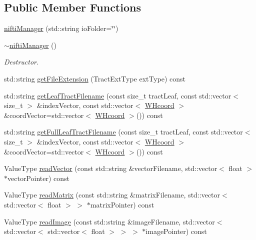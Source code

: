 \subsection*{\-Public \-Member \-Functions}
\begin{DoxyCompactItemize}
\item 
\hyperlink{classniftiManager_a61073824d9db9f8263f68af34854c6a2}{nifti\-Manager} (std\-::string io\-Folder=\char`\"{}\char`\"{})
\item 
\hypertarget{classniftiManager_a30a0d32f3c099739c521003623dc4003}{\hyperlink{classniftiManager_a30a0d32f3c099739c521003623dc4003}{$\sim$nifti\-Manager} ()}\label{classniftiManager_a30a0d32f3c099739c521003623dc4003}

\begin{DoxyCompactList}\small\item\em \-Destructor. \end{DoxyCompactList}\item 
std\-::string \hyperlink{classniftiManager_adedd75842b52a100303f7a953290d080}{get\-File\-Extension} (\-Tract\-Ext\-Type ext\-Type) const 
\item 
std\-::string \hyperlink{classniftiManager_ac3bb3fa42b34aefa6f6c70ba5e1c834b}{get\-Leaf\-Tract\-Filename} (const size\-\_\-t tract\-Leaf, const std\-::vector$<$ size\-\_\-t $>$ \&index\-Vector, const std\-::vector$<$ \hyperlink{classWHcoord}{\-W\-Hcoord} $>$ \&coord\-Vector=std\-::vector$<$ \hyperlink{classWHcoord}{\-W\-Hcoord} $>$()) const 
\item 
std\-::string \hyperlink{classniftiManager_ae47648397db80c5b0630cf1b0f29c560}{get\-Full\-Leaf\-Tract\-Filename} (const size\-\_\-t tract\-Leaf, const std\-::vector$<$ size\-\_\-t $>$ \&index\-Vector, const std\-::vector$<$ \hyperlink{classWHcoord}{\-W\-Hcoord} $>$ \&coord\-Vector=std\-::vector$<$ \hyperlink{classWHcoord}{\-W\-Hcoord} $>$()) const 
\item 
\-Value\-Type \hyperlink{classniftiManager_a7f22a704c5b047b56ca8481f35e47fe3}{read\-Vector} (const std\-::string \&vector\-Filename, std\-::vector$<$ float $>$ $\ast$vector\-Pointer) const 
\item 
\-Value\-Type \hyperlink{classniftiManager_a1578e4cf10becfda948ab29c2f2c6ae3}{read\-Matrix} (const std\-::string \&matrix\-Filename, std\-::vector$<$ std\-::vector$<$ float $>$ $>$ $\ast$matrix\-Pointer) const 
\item 
\-Value\-Type \hyperlink{classniftiManager_ad3a7ba158c081b0aef51e8773fd17902}{read\-Image} (const std\-::string \&image\-Filename, std\-::vector$<$ std\-::vector$<$ std\-::vector$<$ float $>$ $>$ $>$ $\ast$image\-Pointer) const 

\end{DoxyCompactItemize}
